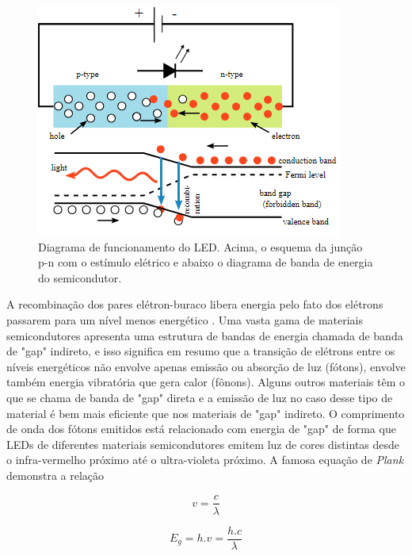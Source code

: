 \begin{figure}[ht]
    \begin{center}
    \includegraphics{figuras/led.PNG}
    \end{center}
    \caption[Diagrama de funcionamento do LED.]{Diagrama de funcionamento do LED. Acima, o esquema da junção p-n com o estímulo elétrico e abaixo o diagrama de banda de energia do semicondutor.}
    \label{led}
\end{figure}


A recombinação dos pares elétron-buraco libera energia pelo fato dos elétrons passarem para um nível menos energético \cite{rezende}. Uma vasta gama de materiais semicondutores apresenta uma estrutura de bandas de energia chamada de banda de "gap" indireto, e isso significa em resumo que a transição de elétrons entre os níveis energéticos não envolve apenas emissão ou absorção de luz (fótons), envolve também energia vibratória que gera calor (fônons). Alguns outros materiais têm o que se chama de banda de "gap" direta e a emissão de luz no caso desse tipo de material é bem mais eficiente que nos materiais de "gap" indireto. O comprimento de onda dos fótons emitidos está relacionado com energia de "gap" de forma que LEDs de diferentes materiais semicondutores emitem luz de cores distintas desde o infra-vermelho próximo até o ultra-violeta próximo. A famosa equação de \textit{Plank} demonstra a relação

\begin{equation}
    \label{eq:led_1}
    v = \frac{c}{\lambda}
\end{equation}

\begin{equation}
    \label{eq:led_2}
    E_g = h.v = \frac{h.c}{\lambda}
\end{equation}
    
